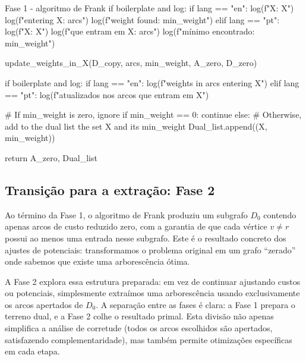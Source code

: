 \begin{pybox}{Fase 1 - algoritmo de Frank}
	if boilerplate and log:
	if lang == "en":
	log(f"\nSet X: {X}")
	log(f"\nArcs entering X: {arcs}")
	log(f"\nMinimum weight found: {min_weight}")
	elif lang == "pt":
	log(f"\nConjunto X: {X}")
	log(f"\nArestas que entram em X: {arcs}")
	log(f"\nPeso mínimo encontrado: {min_weight}")

	update_weights_in_X(D_copy, arcs, min_weight, A_zero, D_zero)

	if boilerplate and log:
	if lang == "en":
	log(f"\nUpdated weights in arcs entering X")
	elif lang == "pt":
	log(f"\nPesos atualizados nos arcos que entram em X")

	# If min_weight is zero, ignore
	if min_weight == 0:
	continue
	else:
	# Otherwise, add to the dual list the set X and its min_weight
	Dual_list.append((X, min_weight))

	return A_zero, Dual_list
\end{pybox}

\subsection{Transição para a extração: Fase 2}

Ao término da Fase 1, o algoritmo de Frank produziu um subgrafo \(D_0\) contendo apenas arcos de custo reduzido zero, com a garantia de que cada vértice \(v\neq r\) possui ao menos uma entrada nesse subgrafo. Este é o resultado concreto dos ajustes de potenciais: transformamos o problema original em um grafo ``zerado'' onde sabemos que existe uma arborescência ótima.


A Fase 2 explora essa estrutura preparada: em vez de continuar ajustando custos ou potenciais, simplesmente extraímos uma arborescência usando exclusivamente os arcos apertados de \(D_0\). A separação entre as fases é clara: a Fase 1 prepara o terreno dual, e a Fase 2 colhe o resultado primal. Esta divisão não apenas simplifica a análise de corretude (todos os arcos escolhidos são apertados, satisfazendo complementaridade), mas também permite otimizações específicas em cada etapa.

